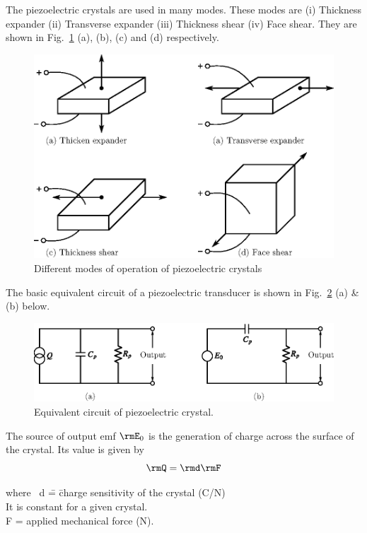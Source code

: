 The piezoelectric crystals are used in many modes. These modes are (i)
Thickness expander (ii)  Transverse  expander (iii) Thickness shear
(iv) Face shear. They are shown in Fig.~\ref{fig9.10} (a), (b), (c) and
(d) respectively.
\begin{figure}[H]
\centering
\includegraphics{chap9/fig9.8.eps}
\caption{Different modes of operation of piezoelectric crystals}\label{fig9.10}
\end{figure}


The basic equivalent circuit of a piezoelectric transducer is shown in
Fig.~\ref{fig9.11} (a) \& (b) below.
\begin{figure}[H]
\centering
\includegraphics{chap9/fig9.9.eps}
\caption{Equivalent circuit of piezoelectric crystal.}\label{fig9.11}
\end{figure}

The source of output emf $\rmE_0$ is the generation of charge across
the surface of the crystal. Its value is given by
\begin{equation}
\rmQ=\rmd\rmF \label{eq9.8}
\end{equation}
\begin{tabbing}
where ~d \= = \= charge sensitivity of the crystal (C/N)\\[4pt]
\> \>  It is constant for a given crystal.\\[4pt]
\qquad \quad F \> = \> applied mechanical force (N).
\end{tabbing}

